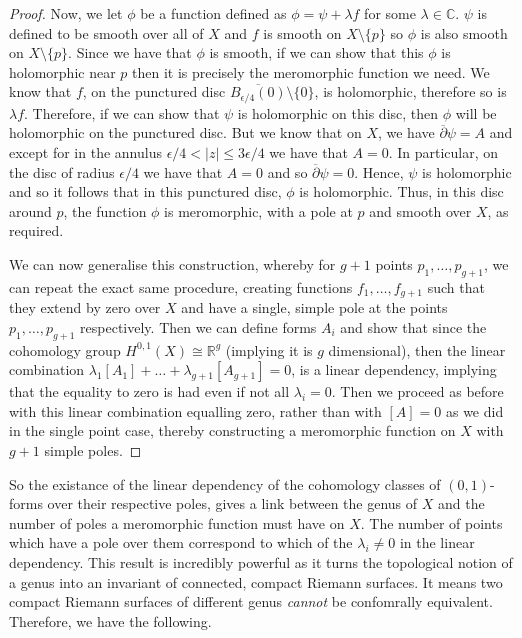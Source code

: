 \documentclass[11pt]{report}
\theoremstyle{definition}
\begin{document}
\begin{proof}
  Now, we let $\phi$ be a function defined as $\phi = \psi + \lambda f$ for some $\lambda \in \mathbb{C}$. $\psi$ is defined to be smooth over all of $X$ and $f$ is smooth on $X\setminus \{p\}$ so $\phi$ is also smooth on $X \setminus \{p\}$. Since we have that $\phi$ is smooth, if we can show that this $\phi$ is holomorphic near $p$ then it is precisely the meromorphic function we need. We know that $f$, on the punctured disc $\overline{B_{\epsilon/4}(0)} \setminus \{0\}$, is holomorphic, therefore so is $\lambda f$. Therefore, if we can show that $\psi$ is holomorphic on this disc, then $\phi$ will be holomorphic on the punctured disc. But we know that on $X$, we have $\overline{\partial}\psi = A$ and except for in the annulus $\epsilon / 4 < |z| \leq 3\epsilon / 4$ we have that $A=0$. In particular, on the disc of radius $\epsilon / 4$ we have that $A=0$ and so $\overline{\partial}\psi = 0$. Hence, $\psi$ is holomorphic and so it follows that in this punctured disc, $\phi$ is holomorphic. Thus, in this disc around $p$, the function $\phi$ is meromorphic, with a pole at $p$ and smooth over $X$, as required.

  We can now generalise this construction, whereby for $g+1$ points $p_1,\ldots, p_{g+1}$, we can repeat the exact same procedure, creating functions $f_1,\ldots,f_{g+1}$ such that they extend by zero over $X$ and have a single, simple pole at the points $p_1,\ldots,p_{g+1}$ respectively. Then we can define forms $A_i$ and show that since the cohomology group $H^{0,1}(X) \cong \mathbb{R}^g$ (implying it is $g$ dimensional), then the linear combination $\lambda_1[A_1]+\ldots+\lambda_{g+1}[A_{g+1}] = 0$, is a linear dependency, implying that the equality to zero is had even if not all $\lambda_i = 0$. Then we proceed as before with this linear combination equalling zero, rather than with $[A]=0$ as we did in the single point case, thereby constructing a meromorphic function on $X$ with $g+1$ simple poles. 
\end{proof}
So the existance of the linear dependency of the cohomology classes of $(0,1)$-forms over their respective poles, gives a link between the genus of $X$ and the number of poles a meromorphic function must have on $X$. The number of points which have a pole over them correspond to which of the $\lambda_i \neq 0$ in the linear dependency. This result is incredibly powerful as it turns the topological notion of a genus into an invariant of connected, compact Riemann surfaces. It means two compact Riemann surfaces of different genus \emph{cannot} be confomrally equivalent. Therefore, we have the following.
\end{document}
